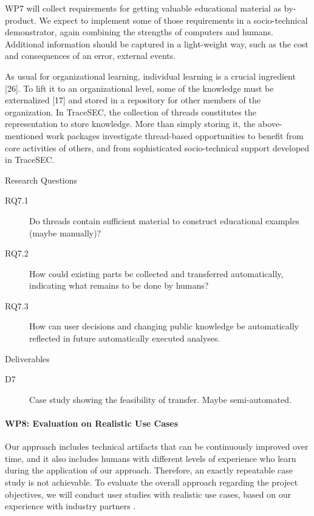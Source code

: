 WP7 will collect requirements for getting valuable educational material as by-product. We expect to implement some of those requirements in a socio-technical demonstrator, again combining the strengths of computers and humans. Additional information should be captured in a light-weight way, such as the cost and consequences of an error, external events.

As usual for organizational learning, individual learning is a crucial ingredient [26]. To lift it to an organizational level, some of the knowledge must be externalized [17] and stored in a repository for other members of the organization. In TraceSEC, the collection of threads constitutes the representation to store knowledge. More than simply storing it, the above-mentioned work packages investigate thread-based opportunities to benefit from core activities of others, and from sophisticated socio-technical support developed in TraceSEC.

Research Questions
\begin{description}
	\item[RQ7.1]	Do threads contain sufficient material to construct educational examples (maybe manually)?
	\item[RQ7.2]	How could existing parts be collected and transferred automatically, indicating what remains to be done by humans?
	\item[RQ7.3]	How can user decisions and changing public knowledge be automatically reflected in future automatically executed analyses.
\end{description}

Deliverables
\begin{description}
	\item[D7] Case study showing the feasibility of transfer. Maybe semi-automated. 
\end{description}

\paragraph*{WP8: Evaluation on Realistic Use Cases}
Our approach includes technical artifacts that can be continuously improved over time, and it also includes humans with different levels of experience who learn during the application of our approach. Therefore, an exactly repeatable case study is not achievable. To evaluate the overall approach regarding the project objectives, we will conduct user studies with realistic use cases, based on our experience with industry partners .


